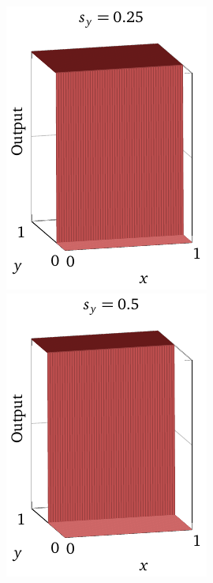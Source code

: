 \documentclass[a4paper,twoside,10pt]{book}
\begin{document}
\begin{center}
	\includegraphics[width=0.32\linewidth]{./figures/ch4/3d/stepy1}
	\includegraphics[width=0.32\linewidth]{./figures/ch4/3d/stepy2}

\end{center}
\end{document}
